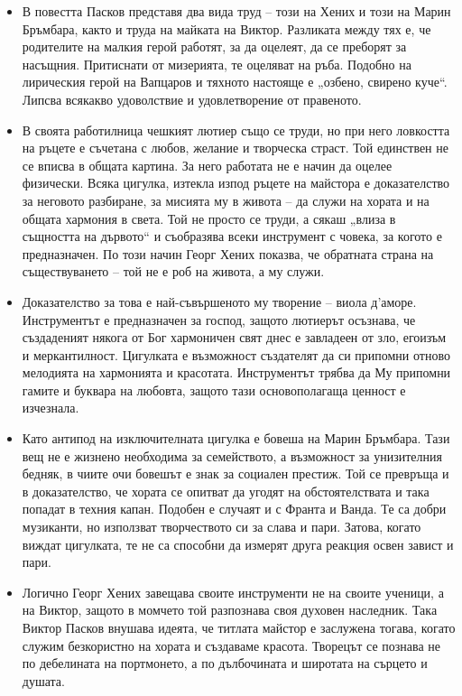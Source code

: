 \documentclass[12pt,a4paper]{article}
\begin{document}
\vspace{0.1cm}
\begin{itemize}[leftmargin=*, noitemsep, topsep=2pt, parsep=0pt]
    \item В повестта Пасков представя два вида труд – този на Хених и този на Марин Бръмбара, както и труда на майката на Виктор. Разликата между тях е, че родителите на малкия герой работят, за да оцелеят, да се преборят за насъщния. Притиснати от мизерията, те оцеляват на ръба. Подобно на лирическия герой на Вапцаров и тяхното настояще е „озбено, свирено куче“. Липсва всякакво удоволствие и удовлетворение от правеното.
    \vspace{0.1cm}
    \item В своята работилница чешкият лютиер също се труди, но при него ловкостта на ръцете е съчетана с любов, желание и творческа страст. Той единствен не се вписва в общата картина. За него работата не е начин да оцелее физически. Всяка цигулка, изтекла изпод ръцете на майстора е доказателство за неговото разбиране, за мисията му в живота – да служи на хората и на общата хармония в света. Той не просто се труди, а сякаш „влиза в същността на дървото“ и съобразява всеки инструмент с човека, за когото е предназначен. По този начин Георг Хених показва, че обратната страна на съществуването – той не е роб на живота, а му служи.
    \vspace{0.1cm}
    \item Доказателство за това е най-съвършеното му творение – виола д’аморе. Инструментът е предназначен за господ, защото лютиерът осъзнава, че създаденият някога от Бог хармоничен свят днес е завладеен от зло, егоизъм и меркантилност. Цигулката е възможност създателят да си припомни отново мелодията на хармонията и красотата. Инструментът трябва да Му припомни гамите и буквара на любовта, защото тази основополагаща ценност е изчезнала.
    \vspace{0.1cm}
    \item Като антипод на изключителната цигулка е бовеша на Марин Бръмбара. Тази вещ не е жизнено необходима за семейството, а възможност за унизителния бедняк, в чиите очи бовешът е знак за социален престиж. Той се превръща и в доказателство, че хората се опитват да угодят на обстоятелствата и така попадат в техния капан. Подобен е случаят и с Франта и Ванда. Те са добри музиканти, но използват творчеството си за слава и пари. Затова, когато виждат цигулката, те не са способни да измерят друга реакция освен завист и пари.
    \vspace{0.1cm}
    \item Логично Георг Хених завещава своите инструменти не на своите ученици, а на Виктор, защото в момчето той разпознава своя духовен наследник. Така Виктор Пасков внушава идеята, че титлата майстор е заслужена тогава, когато служим безкористно на хората и създаваме красота. Творецът се познава не по дебелината на портмонето, а по дълбочината и широтата на сърцето и душата.
\end{itemize}
\end{document}
